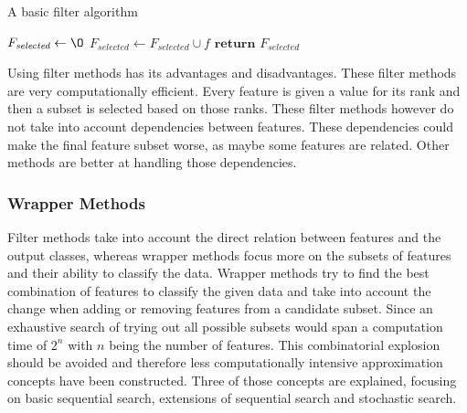 \documentclass[10pt,a4paper]{article}
\begin{document}
	\begin{algorithm}[H]
		\caption{A basic filter algorithm\cite{Duch2006}}\label{alg:FilterAlgorithm}
		\begin{algorithmic}[1]
			\State $F_{\textit{selected}} \gets \O$ 	
			 					
						
			\State $F_{\textit{selected}} \gets F_{\textit{selected}} \cup f$ 
			\EndIf
			\EndFor
			\State $\textbf{return } F_{\textit{selected}}$
			\EndProcedure
		\end{algorithmic}
	\end{algorithm}
	
	Using filter methods has its advantages and disadvantages. These filter methods are very computationally efficient. Every feature is given a value for its rank and then a subset is selected based on those ranks. These filter methods however do not take into account dependencies between features. These dependencies could make the final feature subset worse, as maybe some features are related. Other methods are better at handling those dependencies\cite{Duch2006, saeys2007review}.
	
	\subsubsection{Wrapper Methods}
	\label{subsec:WrapperMethods}
	
	Filter methods take into account the direct relation between features and the output classes, whereas wrapper methods focus more on the subsets of features and their ability to classify the data. Wrapper methods try to find the best combination of features to classify the given data and take into account the change when adding or removing features from a candidate subset\cite{Reunanen2006}. Since an exhaustive search of trying out all possible subsets would span a computation time of $2^n$ with $n$ being the number of features\cite{Alsallakh2016PowerSet}. This combinatorial explosion should be avoided and therefore less computationally intensive approximation concepts have been constructed. Three of those concepts are explained, focusing on basic sequential search, extensions of sequential search and stochastic search.
	
\end{document}
